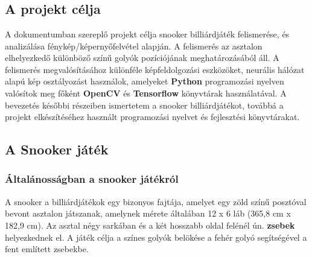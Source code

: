 \chapter{\bevezetes}

\section{A projekt célja}
A dokumentumban szereplő projekt célja snooker billiárdjáték felismerése, és analizálása fénykép/képernyőfelvétel alapján. A felismerés az asztalon elhelyezkedő különböző színű golyók pozíciójának meghatározásából áll. A felismerés megvalósításához különféle képfeldolgozási eszközöket, neurális hálózat alapú kép osztályozást használok, amelyeket \textbf{Python} programozási nyelven valósítok meg főként \textbf{OpenCV} és \textbf{Tensorflow} könyvtárak használatával. A bevezetés későbbi részeiben ismertetem a snooker billiárdjátékot, továbbá a projekt elkészítéséhez használt programozási nyelvet és fejlesztési könyvtárakat.

\section{A Snooker játék}
\subsection{Általánosságban a snooker játékról}
A snooker a billiárdjátékok egy bizonyos fajtája, amelyet egy zöld színű posztóval bevont asztalon játszanak, amelynek mérete általában 12 x 6 láb (365,8 cm x 182,9 cm)\cite{snooker_rules}. Az asztal négy sarkában és a két hosszabb oldal felénél ún. \textbf{zsebek} helyezkednek el. A játék célja a színes golyók belökése a fehér golyó segítségével a fent említett zsebekbe.

